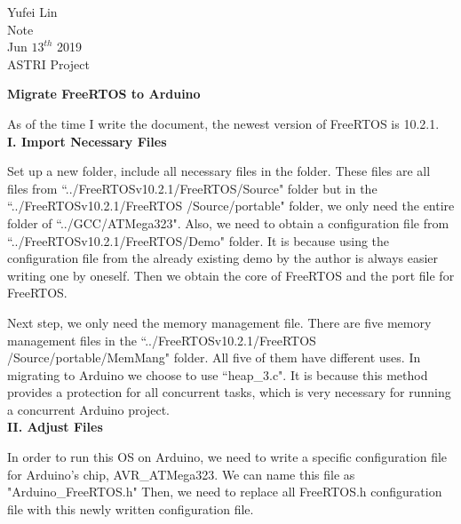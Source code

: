 \documentclass[a4paper,12pt]{report}
\begin{document}
\noindent
Yufei Lin\\

\noindent
Note\\

\noindent
Jun \(13^{th}\) 2019\\

\noindent
ASTRI Project

\begin{center}
\textbf{Migrate FreeRTOS to Arduino}
\end{center}

\noindent
As of the time I write the document, the newest version of FreeRTOS is 10.2.1.\\

\noindent
\textbf{I. Import Necessary Files}

\noindent
Set up a new folder, include all necessary files in the folder. These files are all files from ``../FreeRTOSv10.2.1/FreeRTOS/Source" folder but in the ``../FreeRTOSv10.2.1/FreeRTOS /Source/portable" folder, we only need the entire folder of ``../GCC/ATMega323". Also, we need to obtain a configuration file from ``../FreeRTOSv10.2.1/FreeRTOS/Demo" folder. It is because using the configuration file from the already existing demo by the author is always easier writing one by oneself. 
Then we obtain the core of FreeRTOS and the port file for FreeRTOS. 

\noindent
Next step, we only need the memory management file. There are five memory management files in the ``../FreeRTOSv10.2.1/FreeRTOS /Source/portable/MemMang" folder. All five of them have different uses. In migrating to Arduino we choose to use ``heap\_3.c". It is because this method provides a protection for all concurrent tasks, which is very necessary for running a concurrent Arduino project. \\

\noindent
\textbf{II. Adjust Files}

\noindent
In order to run this OS on Arduino, we need to write a specific configuration file for Arduino's chip, AVR\_ATMega323. We can name this file as "Arduino\_FreeRTOS.h" Then, we need to replace all FreeRTOS.h configuration file with this newly written configuration file.
 
\end{document}
